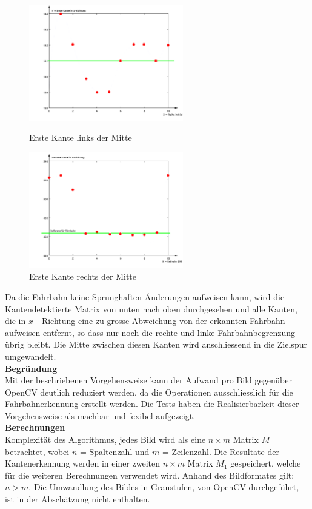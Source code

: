 \begin{figure}[ht!]
\centering
\includegraphics[width=0.6\textwidth]{03_Loesungskonzept/pictures/minEdge.png}
\caption{Erste Kante links der Mitte}
\includegraphics[width=0.6\textwidth]{03_Loesungskonzept/pictures/maxEdge.png}
\caption{Erste Kante rechts der Mitte}
\label{fig:kanten}
\end{figure}
Da die Fahrbahn keine Sprunghaften Änderungen aufweisen kann, wird die Kantendetektierte Matrix von unten nach oben durchgesehen und alle Kanten, die in $x$ - Richtung eine zu grosse Abweichung von der erkannten Fahrbahn aufweisen entfernt, so dass nur noch die rechte und linke Fahrbahnbegrenzung übrig bleibt. Die Mitte zwischen diesen Kanten wird anschliessend in die Zielspur umgewandelt.\\
\textbf{Begründung}\\
Mit der beschriebenen Vorgehensweise kann der Aufwand pro Bild gegenüber OpenCV deutlich reduziert werden, da die Operationen ausschliesslich für die Fahrbahnerkennung erstellt werden. Die Tests haben die Realisierbarkeit dieser Vorgehensweise als machbar und fexibel aufgezeigt.\\
\textbf{Berechnungen}\\
Komplexität des Algorithmus, jedes Bild wird als eine $n\times{m}$ Matrix $M$ betrachtet, wobei $n$ = Spaltenzahl und $m$ = Zeilenzahl. Die Resultate der Kantenerkennung werden in einer zweiten $n\times{m}$ Matrix $M_1$ gespeichert, welche für die weiteren Berechnungen verwendet wird. Anhand des Bildformates gilt: $n>m$. Die Umwandlung des Bildes in Graustufen, von OpenCV durchgeführt, ist in der Abschätzung nicht enthalten.
